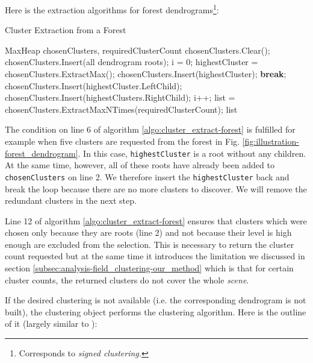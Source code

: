 Here is the extraction algorithms for forest dendrograms\footnote{Corresponds to {\it signed clustering.}}:

\begin{algorithm}[H]
\caption{Cluster Extraction from a Forest}
\label{algo:cluster_extract-forest}
\begin{algorithmic}[1]

\Require MaxHeap chosenClusters, requiredClusterCount
\Statex
\State chosenClusters.Clear();
\State chosenClusters.Insert(all dendrogram roots);
\State i = 0;
	\State highestCluster = chosenClusters.ExtractMax();
		\State chosenClusters.Insert(highestCluster);
		\State \textbf{break};
	\EndIf
    \State chosenClusters.Insert(highestCluster.LeftChild);
    \State chosenClusters.Insert(highestClusters.RightChild);
    \State i++;
\EndWhile
\State list = chosenClusters.ExtractMaxNTimes(requiredClusterCount);
\Statex
\Return list
\end{algorithmic}
\end{algorithm}

The condition on line 6 of algorithm \ref{algo:cluster_extract-forest} is fulfilled for example when five clusters are requested from the forest in Fig. \ref{fig:illustration-forest_dendrogram}. In this case, \verb+highestCluster+ is a root without any children. At the same time, however, all of these roots have already been added to \verb+chosenClusters+ on line 2. We therefore insert the \verb+highestCluster+ back and break the loop because there are no more clusters to discover. We will remove the redundant clusters in the next step.

Line 12 of algorithm \ref{algo:cluster_extract-forest} ensures that clusters which were chosen only because they are roots (line 2) and not because their level is high enough are excluded from the selection. This is necessary to return the cluster count requested but at the same time it introduces the limitation we discussed in section \ref{subsec:analysis-field_clustering-our_method} which is that for certain cluster counts, the returned clusters do not cover the whole {\it scene}.

If the desired clustering is not available (i.e. the corresponding dendrogram is not built), the clustering object performs the clustering algorithm. Here is the outline of it (largely similar to \citet{Telea99}):

